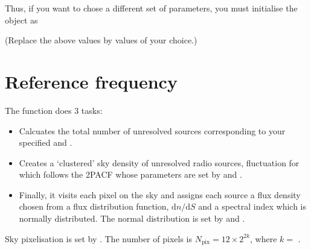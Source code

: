\documentclass[letterpaper,10pt,english]{sphinxmanual}
\begin{document}
\sphinxAtStartPar
Thus, if you want to chose a different set of parameters, you must
initialise the object as

\sphinxAtStartPar
{}

\sphinxAtStartPar
(Replace the above values by values of your choice.)


\section{Reference frequency}
\label{\detokenize{detexp:reference-frequency}}
\sphinxAtStartPar
The function  does 3 tasks:\sphinxhyphen{}
\begin{itemize}
\item {} 
\sphinxAtStartPar
Calcuates the total number of unresolved sources corresponding to
your specified  and .

\item {} 
\sphinxAtStartPar
Creates a ‘clustered’ sky density of unresolved radio sources,
fluctuation for which follows the 2PACF whose parameters are set by
 and .

\item {} 
\sphinxAtStartPar
Finally, it visits each pixel on the sky and assigns each source a
flux density chosen from a flux distribution function,
\(\mathrm{d}n/\mathrm{d}S\) and a
spectral index which is normally distributed. The normal distribution
is set by  and .

\end{itemize}

\sphinxAtStartPar
Sky pixelisation is set by . The number of pixels is
\(N_{\mathrm{pix}} = 12\times 2^{2k}\), where \(k=\) .
\end{document}
